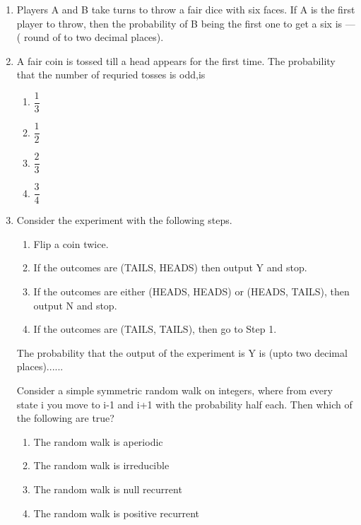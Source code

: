 \begin{enumerate}[label=\thesection.\arabic*.,ref=\thesection.\theenumi]
%
\item Players A and B take turns to throw a fair dice with six faces. If A is the first player to throw, then the probability of B being the first one to get a six is --- ( round of to two decimal places). \\
\solution

%
\item A fair coin is tossed till a head appears for the first time. The probability that the number of requried tosses is odd,is\\
\begin{enumerate}
    \item $\dfrac{1}{3}$\\
    \item $\dfrac{1}{2}$\\
    \item $\dfrac{2}{3}$\\
    \item $\dfrac{3}{4}$
\end{enumerate}
\solution
  
%
\item  Consider the experiment with the following steps.
\begin{enumerate}
\item  Flip a coin twice.
\item If the outcomes are (TAILS, HEADS) then output Y and stop.
\item If the outcomes are either (HEADS, HEADS) or (HEADS, TAILS), then output N and stop.
\item If the outcomes are (TAILS, TAILS), then go to Step 1.
\end{enumerate}
The probability that the output of the experiment is Y is (upto two decimal places)......
\\
\solution 
  
  Consider a simple symmetric random walk on integers, where from every state i you move to i-1 and i+1 with the probability half each. Then which of the following are true?
  \begin{enumerate}
  \item The random walk is aperiodic
  \item The random walk is irreducible
  \item The random walk is null recurrent 
  \item The random walk is positive recurrent
  \end{enumerate}

\end{enumerate}